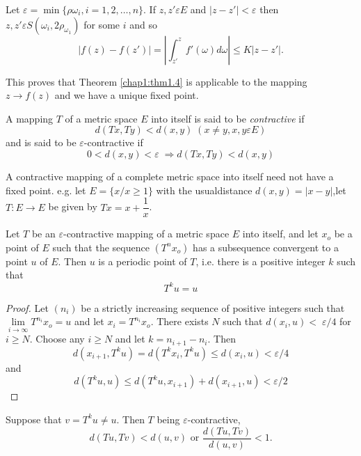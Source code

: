 Let $\varepsilon = \min \{ \rho \omega_i, i=1, 2, \ldots, n \}$. If 
$z,z'\varepsilon E$ and $|z-z'|< \varepsilon$ then $z,z' \varepsilon
S(\omega_i, 2 \rho_{\omega_{1}})$ for some $i$ and so  
$$
|f(z)- f(z')| = |\int_{z'}^{z} f' (\omega) d \omega |\leq K |z-z'|.
$$

This proves that Theorem \ref{chap1:thm1.4} is applicable to the
mapping $z \to f(z)$ and we have a unique fixed point.  

\begin{Definition}%
  A mapping $T$ of a metric space $E$ into itself is said to be {\em
    contractive} if  
  $$
  d(Tx, Ty)< d(x,y) \; (x \neq y, x,y \varepsilon E)
  $$
  and is said to be $\varepsilon$-contractive if
  $$
  0< d (x,y)< \varepsilon \; \Rightarrow d(Tx, Ty)< d(x,y)
  $$
\end{Definition}

  \begin{remark*}
    A contractive mapping of a complete metric space into itself need
    not have a fixed point. e.g. let $E= \{x/ x \geq 1 \}$ with the
    usual\pageoriginale distance $d (x,y) = |x-y|$,let $T :E \to E$ be
    given by $Tx  = x + \dfrac{1}{x}$. 
  \end{remark*}

  \begin{thmm}[Edelsten]\label{chap1:thm1.5}%
    Let $T$ be an $\varepsilon$-contractive mapping of a metric space $E$
    into itself, and let $x_o$ be a point of $E$ such that the
    sequence $(T^n x_o)$ has a subsequence convergent  to a point $u$
    of $E$. Then $u$ is a periodic point of $T$, i.e. there is a
    positive integer $k$ such that 
    $$
    T^k u = u
    $$
  \end{thmm}

\begin{proof}
  Let $(n_i)$ be a strictly increasing sequence of positive integers
  such that $\lim\limits_{i \to \infty} T^{n_{i}} x_o = u$ and let
  $x_i = T^{n_{i}}x_o$. There exists $N$ such that $d(x_i, u) < \; \varepsilon/4$
  for $i \geq N$. Choose any $i \geq N$ and let $k = n_{i+1} -
  n_i$. Then 
  $$
  d(x_{i+1}, T^k u) = d(T^k x_i , T^k u) \leq d(x_i, u) <
  \varepsilon/4 
  $$
  and 
  $$
  d (T^k u, u) \leq d(T^k u, x_{i+1}) + d(x_{i+1}, u) < \varepsilon/2
  $$
\end{proof}

Suppose that $v = T^k u \neq u$. Then $T$ being $\varepsilon$-contractive, 
$$
d(Tu, Tv)< d(u,v) \text{ or } \frac{d(Tu, Tv)}{d(u,v)}< 1.
$$

